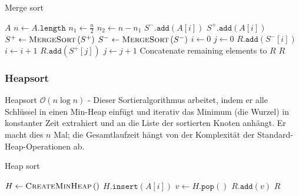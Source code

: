 \documentclass[a4paper]{article}
\begin{document}
        \begin{algorithm}[h]
            \caption{Merge sort}
            \label{alg:MergeSort}
            \begin{algorithmic}
              \State \Return $A$
              \EndIf
              \State $n \gets A\texttt{.length}$
              \State $n_1 \gets \frac n2$
              \State $n_2 \gets n-n_1$
              \State $S^-\texttt{.add}\left(A\left[i\right]\right)$
              \Else
              \State $S^+\texttt{.add}\left(A\left[i\right]\right)$
              \EndIf
              \EndFor
              \State $S^+ \gets \textsc{MergeSort}\left(S^+\right)$
              \State $S^- \gets \textsc{MergeSort}\left(S^-\right)$
              \State $i\gets 0$ 
              \State $j\gets 0$
              \State $R\texttt{.add}\left(S^-\left[i\right]\right)$
              \State $i \gets i+1$
              \Else
              \State $R\texttt{.add}\left(S^+\left[j\right]\right)$
              \State $j \gets j+1$
              \EndIf
              \EndWhile
              \State Concatenate remaining elements to $R$
              \State \Return $R$
              \EndFunction
            \end{algorithmic}
            \end{algorithm}
            
        
\newpage
    \subsubsection{Heapsort}\label{Heapsort}
        Heapsort $\mathcal{O}(n \log n)$ - Dieser Sortieralgorithmus arbeitet, indem er alle Schlüssel in einen Min-Heap einfügt und iterativ das Minimum (die Wurzel) in konstanter Zeit extrahiert und an die Liste der sortierten Knoten anhängt. Er macht dies $n$ Mal; die Gesamtlaufzeit hängt von der Komplexität der Standard-Heap-Operationen ab.
        
        \begin{algorithm}[h]
            \caption{Heap sort}
            \label{alg:HeapSort}
            \begin{algorithmic} 
            \State $H \gets \textsc{CreateMinHeap}\left(\right)$
            \State $H\texttt{.insert}\left(A\left[i\right]\right)$
            \EndFor
            \State $v \gets H\texttt{.pop}\left(\right)$
            \State $R\texttt{.add}\left(v\right)$
            \EndFor
            \State \Return $R$
            \end{algorithmic}
        \end{algorithm}
        
\end{document}
